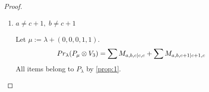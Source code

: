 \begin{proof}
\begin{enumerate}
\begin{enumerate}
      \item $a = c+1, \; b\neq c+1 \text{hence } d \neq c+1 $
        \begin{enumerate}
          \item $b\neq c+2$ \par
        Let $\mu:=\lambda + (0,0,0,0,2) $.
        \begin{equation}\notag
          \begin{aligned}
            Pr_{\lambda}(P_\mu \otimes V_{5}) &=
\sum M_{c+1,b,c|d,c}
+ \sum M_{c+1,b,c+1|d,c+1}
+ \sum M_{c+2,b,c+1|d,c+2}
          \end{aligned}
        \end{equation}
All items belong to $P_\lambda$ by \cref{prop:1}.
        
          \item $b=c+2$ \par
        Let $\mu:=\lambda + (1,0,1,0,0) $.
        \begin{equation}\notag
          \begin{aligned}
            Pr_{\lambda}(P_\mu \otimes V_{6}) &=
\sum M_{c+1,c+2,c|d,c}
+ \sum M_{c+1,c+2,c+1|d,c+1}
+ \sum M_{c+2,c+2,c+1|d,c+2}
          \end{aligned}
        \end{equation}
All items belong to $P_\lambda$ by \cref{prop:1}.

        \end{enumerate}

      \item $a=c+1,\; b=c+1$ \par
        Let $\mu:=\lambda + (0,0,0,0,2) $.
        \begin{equation}\notag
          \begin{aligned}
            Pr_{\lambda}(P_\mu \otimes V_{5}) &=
\sum M_{c+1,c+1,c|d,c}
+ \sum M_{c+1,c+1,c+1|d,c+1}
+ \sum M_{c+1,c+2,c+1|d,c+2}
          \end{aligned}
        \end{equation}
All items belong to $P_\lambda$ by \cref{prop:1}.
    \end{enumerate}

  \item $a\neq c+1,\; b\neq c+1$ \par
        Let $\mu:=\lambda + (0,0,0,1,1) $.
        \begin{equation}\notag
          \begin{aligned}
            Pr_{\lambda}(P_\mu \otimes V_{3}) &=
\sum M_{a,b,c|c,c}
+ \sum M_{a,b,c+1|c+1,c}
          \end{aligned}
        \end{equation}
All items belong to $P_\lambda$ by \cref{prop:1}.


\end{enumerate}
\end{proof}
